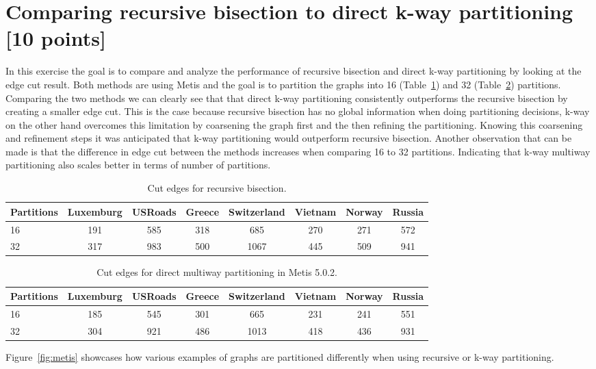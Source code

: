 \newpage
\section{Comparing recursive bisection to direct k-way partitioning [10 points]}
In this exercise the goal is to compare and analyze the performance of recursive bisection and direct k-way partitioning by looking at the edge cut result. Both methods are using Metis and the goal is to partition the graphs into 16 (Table~\ref{tab:partitions_rec}) and 32 (Table~\ref{tab:partitions_k_way}) partitions. Comparing the two methods we can clearly see that that direct k-way partitioning consistently outperforms the recursive bisection by creating a smaller edge cut. This is the case because recursive bisection has no global information when doing partitioning decisions, k-way on the other hand overcomes this limitation by coarsening the graph first and the then refining the partitioning. Knowing this coarsening and refinement steps it was anticipated that k-way partitioning would outperform recursive bisection. Another observation that can be made is that the difference in edge cut between the methods increases when comparing 16 to 32 partitions. Indicating that k-way multiway partitioning also scales better in terms of number of partitions.
\begin{table}[H]
	\centering
	\begin{tabular}{lccccccc} %
		\toprule
		Partitions & Luxemburg & USRoads & Greece & Switzerland & Vietnam & Norway & Russia \\
		\midrule
		16         & 191       & 585        & 318    & 685         & 270     & 271    & 572    \\
		32         & 317       & 983        & 500    & 1067        & 445     & 509    & 941    \\
		\bottomrule
	\end{tabular}
	\caption{Cut edges for recursive bisection.}
	\label{tab:partitions_rec}
\end{table}

\begin{table}[H]
	\centering
	\begin{tabular}{lccccccc} %
		\toprule
		Partitions & Luxemburg & USRoads & Greece & Switzerland & Vietnam & Norway & Russia \\
		\midrule
		16         & 185       & 545        & 301    & 665         & 231     & 241    & 551    \\
		32         & 304       & 921        & 486    & 1013        & 418     & 436    & 931    \\
		\bottomrule
	\end{tabular}
	\caption{Cut edges for direct multiway partitioning in Metis 5.0.2.}
	\label{tab:partitions_k_way}
\end{table}
Figure~\ref{fig:metis} showcases how various examples of graphs are partitioned differently when using recursive or k-way partitioning.

